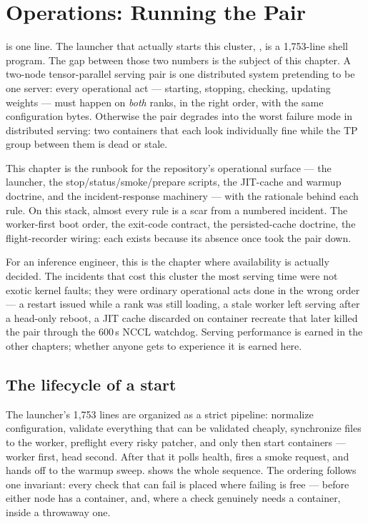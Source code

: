 \chapter{Operations: Running the Pair}
\label{ch:operations}

 is one line. The launcher that actually starts this
cluster, , is a 1{,}753-line
shell program. The gap between those two numbers is the subject of this
chapter. A two-node tensor-parallel serving pair is one distributed system
pretending to be one server: every operational act --- starting, stopping,
checking, updating weights --- must happen on \emph{both} ranks, in the
right order, with the same configuration bytes. Otherwise the pair degrades
into the worst failure mode in distributed serving: two containers that each
look individually fine while the TP group between them is dead or stale.

This chapter is the runbook for the repository's operational surface --- the
launcher, the stop/status/smoke/prepare scripts, the JIT-cache and warmup
doctrine, and the incident-response machinery --- with the rationale behind
each rule. On this stack, almost every rule is a scar from a numbered
incident. The worker-first boot order, the exit-code contract, the
persisted-cache doctrine, the flight-recorder wiring: each exists because
its absence once took the pair down.

For an inference engineer, this is the chapter where availability is
actually decided. The incidents that cost this cluster the most serving time
were not exotic kernel faults; they were ordinary operational acts done in
the wrong order --- a restart issued while a rank was still loading, a
stale worker left serving after a head-only reboot, a JIT cache discarded
on container recreate that later killed the pair through the 600\,s NCCL
watchdog. Serving performance is earned in the other chapters; whether
anyone gets to experience it is earned here.

\section{The lifecycle of a start}
\label{sec:ops-lifecycle}

The launcher's 1{,}753 lines are organized as a strict pipeline: normalize
configuration, validate everything that can be
validated cheaply, synchronize files to the worker, preflight every risky
patcher, and only then start containers --- worker first, head second.
After that it polls health, fires a smoke request, and hands off to the
warmup sweep.
 shows the whole sequence. The ordering follows
one invariant: every check that can fail is placed where failing is free ---
before either node has a container, and, where a check genuinely needs a
container, inside a throwaway one.

